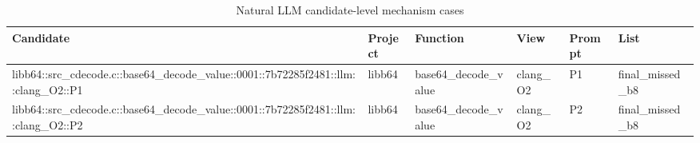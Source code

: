 \begin{table}[t]
\centering
\small
\caption{Natural LLM candidate-level mechanism cases}
\begin{tabular}{llllll}
\toprule
Candidate & Project & Function & View & Prompt & List \\
\midrule
libb64::src\_cdecode.c::base64\_decode\_value::0001::7b72285f2481::llm::clang\_O2::P1 & libb64 & base64\_decode\_value & clang\_O2 & P1 & final\_missed\_b8 \\
libb64::src\_cdecode.c::base64\_decode\_value::0001::7b72285f2481::llm::clang\_O2::P2 & libb64 & base64\_decode\_value & clang\_O2 & P2 & final\_missed\_b8 \\
\bottomrule
\end{tabular}
\end{table}

